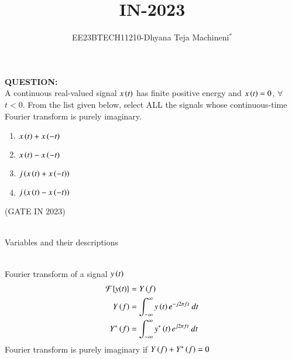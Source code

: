 \documentclass[journal,12pt,twocolumn]{IEEEtran}
\theoremstyle{remark}
\begin{document}

\vspace{3cm}
\title{\textbf{IN-2023}}
\author{EE23BTECH11210-Dhyana Teja Machineni$^{*}$%
}
\maketitle
\newpage
\bigskip

\textbf{QUESTION:}\\
A continuous real-valued signal $x\left(t\right)$ has finite positive energy and $x\left(t\right) = 0$, $\forall$ $t < 0$. From the list given below, select ALL the signals whose
continuous-time Fourier transform is purely imaginary.\\
\begin{enumerate}
\item$x\left(t\right) + x\left(-t\right)$
\item$x\left(t\right) - x\left(-t\right)$
\item$j\left(x\left(t\right) + x\left(-t\right)\right)$
\item$j\left(x\left(t\right) - x\left(-t\right)\right)$
\end{enumerate}
\hfill{(GATE IN 2023)}\\
\solution\\
\begin{table}[h]
         \label{tab:table}
         
         \caption{Variables and their descriptions}
     \end{table}\\
Fourier transform of a signal $y\left(t\right)$\\
\begin{align}
\mathcal{F}\{y(t)\} &= Y\left(f\right)\\
Y\left(f\right)&=\int_{-\infty}^{\infty} y\left(t\right) e^{-j 2\pi f t} \ dt\\
Y^*\left(f\right)&=\int_{-\infty}^{\infty} y^*\left(t\right) e^{j 2\pi f t} \ dt
\end{align}
Fourier transform is purely imaginary if $Y\left(f\right)+Y^*\left(f\right)=0$\\
\end{document}
